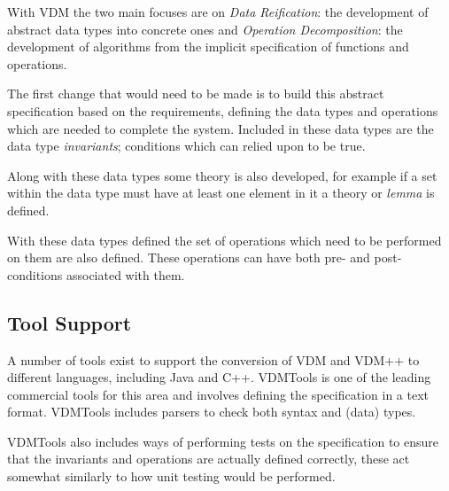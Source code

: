 \documentclass[a4paper, notitlepage, fleqn]{article}
\begin{document}
With VDM the two main focuses are on \emph{Data Reification}: the development of abstract data 
types into concrete ones and \emph{Operation Decomposition}: the development of algorithms from
the implicit specification of functions and operations.

The first change that would need to be made is to build this abstract specification based on the
requirements, defining the data types and operations which are needed to complete the system.
Included in these data types are the data type \emph{invariants}; conditions which can relied 
upon to be true.

Along with these data types some theory is also developed, for example if a set within the data
type must have at least one element in it a theory or \emph{lemma} is defined.

With these data types defined the set of operations which need to be performed on them are also
defined. These operations can have both pre- and post- conditions associated with them.




\subsection*{Tool Support}
A number of tools exist to support the conversion of VDM and VDM++ to different languages, 
including Java and C++. VDMTools is one of the leading commercial tools for this area and involves
defining the specification in a text format. VDMTools includes parsers to check both syntax and 
(data) types.

VDMTools also includes ways of performing tests on the specification to ensure that the invariants
and operations are actually defined correctly, these act somewhat similarly to how unit testing
would be performed.




\end{document}
